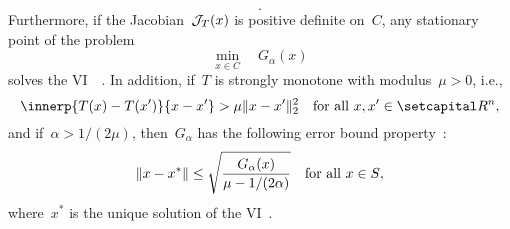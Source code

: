 \documentclass[../../main]{subfiles}
\begin{document}
\begin{example}
\begin{description}
\begin{equation}
            .\end{equation} 
            Furthermore, if the Jacobian~$\mathcal{J}_{T}(x)$ is positive definite on~$C$, any stationary point of the problem
            \begin{equation}
                \min_{x \in C} \quad G_\alpha(x)
            \end{equation} 
            solves the VI~~\cite{Fukushima1992}.
            In addition, if~$T$ is strongly monotone with modulus~$\mu > 0$, i.e.,
            \begin{equation}
                \innerp{T(x) - T(x')}{x - x'} > \mu \norm{x - x'}_2^2 \forallcondition{x, x' \in \setR^n}
            ,\end{equation}
            and if~$\alpha > 1 / (2 \mu)$, then~$G_\alpha$ has the following error bound property~\cite{Taji1993}:
            \begin{equation}
                \lVert x - x^\ast\rVert \le \sqrt{\frac{G_\alpha(x)}{\mu - 1 / (2 \alpha)}} \quad \text{for all~$x \in S$}
            ,\end{equation} 
            where~$x^\ast$ is the unique solution of the VI~.
    \end{description}
\end{example}
\end{document}
